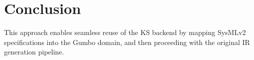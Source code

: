 \documentclass{article}
\begin{document}
\section*{Conclusion}
This approach enables seamless reuse of the KS backend by mapping SysMLv2 specifications into the Gumbo domain, and then proceeding with the original IR generation pipeline.
\end{document}
